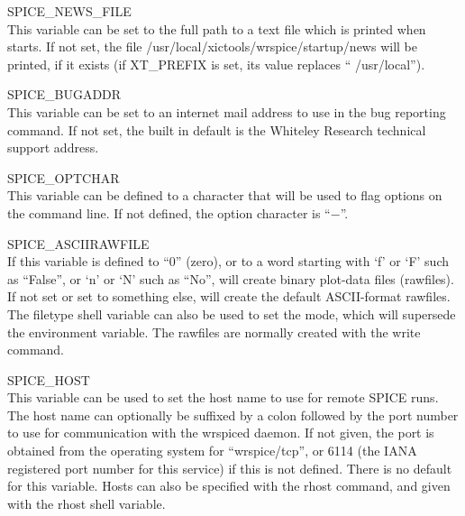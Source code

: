 \begin{description}
\item{\et SPICE\_NEWS\_FILE}\\
This variable can be set to the full path to a text file which is
printed when {\WRspice} starts.  If not set, the file {\vt
/usr/local/xictools/wrspice/startup/news} will be printed, if it
exists (if {\et XT\_PREFIX} is set, its value replaces ``{\vt
/usr/local}'').

\item{\et SPICE\_BUGADDR}\\
This variable can be set to an internet mail address to use in the bug
reporting command.  If not set, the built in default is the Whiteley
Research technical support address.

\item{\et SPICE\_OPTCHAR}\\
This variable can be defined to a character that will be used to flag
options on the {\WRspice} command line.  If not defined, the option
character is ``$-$''.

\item{\et SPICE\_ASCIIRAWFILE}\\
If this variable is defined to ``0'' (zero), or to a word starting
with `{\vt f}' or `{\vt F}' such as ``{\vt False}'', or `{\vt n}' or
`{\vt N}' such as ``{\vt No}'', {\WRspice} will create binary
plot-data files (rawfiles).  If not set or set to something else,
{\WRspice} will create the default ASCII-format rawfiles.  The {\et
filetype} shell variable can also be used to set the mode, which will
supersede the environment variable.  The rawfiles are normally created
with the {\cb write} command.

\item{\et SPICE\_HOST}\\
This variable can be used to set the host name to use for remote SPICE
runs.  The host name can optionally be suffixed by a colon followed by
the port number to use for communication with the {\vt wrspiced}
daemon.  If not given, the port is obtained from the operating system
for ``{\vt wrspice/tcp}'', or 6114 (the IANA registered port number
for this service) if this is not defined.  There is no default for
this variable.  Hosts can also be specified with the {\cb rhost}
command, and given with the {\et rhost} shell variable.


\end{description}

